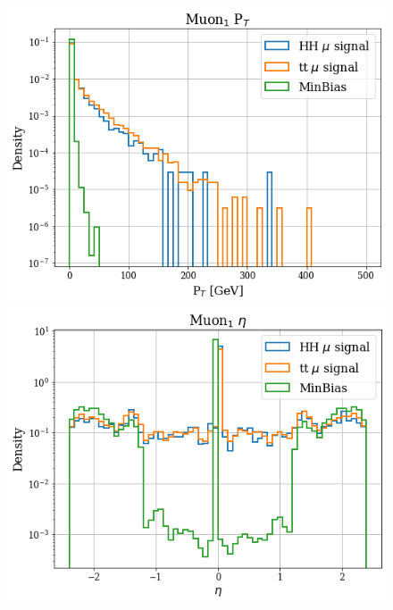 \documentclass[../main.tex]{subfiles}
\begin{document}
\begin{figure}[h]
  \begin{minipage}[b]{0.33\linewidth}
    \centering
    \includegraphics[width=1\linewidth]{Chapters/Plots/Hist_1mu_muon1_Pt.png}
  \end{minipage}%
  \begin{minipage}[b]{0.33\linewidth}
    \centering
    \includegraphics[width=1\linewidth]{Chapters/Plots/Hist_1mu_muon1_Eta.png}
  \end{minipage} %
  \begin{minipage}[b]{0.33\linewidth}

\end{minipage}
\end{figure}
\end{document}
